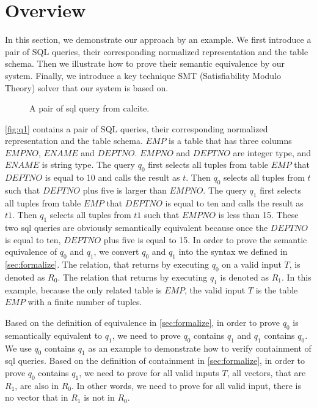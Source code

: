 \section{Overview}\label{sec:overview}
%
In this section, we demonstrate our approach by an example.
%
We first introduce a pair of SQL queries, their corresponding normalized representation and the table schema.
%
Then we illustrate how to prove their semantic equivalence by our system.
%
Finally, we introduce a key technique SMT (Satisfiability Modulo Theory) solver that our system is based on.

%
\begin{figure}

\caption{%
    A pair of sql query from calcite.
  }\label{fig:q1}
\end{figure}
%

\autoref{fig:q1} contains a pair of SQL queries, their corresponding normalized representation and the table schema.
%
$EMP$ is a table that has three columns $EMPNO$, $ENAME$ and $DEPTNO$.
%
$EMPNO$ and $DEPTNO$ are integer type, and $ENAME$ is string type.
%
The query $q_0$ first selects all tuples from table $EMP$ that $DEPTNO$ is equal to
10 and calls the result as $t$.
%
Then $q_0$ selects all tuples from $t$ such that $DEPTNO$ plus five is larger than $EMPNO$.
%
The query $q_1$ first selects all tuples from table $EMP$ that $DEPTNO$ is equal to
ten and calls the result as $t1$.
%
Then $q_1$ selects all tuples from $t1$ such that $EMPNO$ is less than 15.
%
These two sql queries are obviously semantically equivalent 
because once the $DEPTNO$ is equal to ten, $DEPTNO$ plus five is equal to 15.
%
In order to prove the semantic equivalence of $q_0$ and $q_1$, we convert $q_0$ and 
$q_1$ into the syntax we defined in \autoref{sec:formalize}.
%
The relation, that returns by executing $q_0$ on a valid input $T$, is denoted as $R_0$.
%
The relation that returns by executing $q_1$ is denoted as $R_1$.
%
In this example, because the only related table is $EMP$, the valid input $T$ is the table $EMP$ with a
finite number of tuples.

%
Based on the definition of equivalence in \autoref{sec:formalize}, in order to prove $q_0$ is semantically
equivalent to $q_1$, we need to prove $q_0$ contains $q_1$ and $q_1$ contains $q_0$.
%
We use $q_0$ contains $q_1$ as an example to demonstrate how to verify containment of sql queries.
%
Based on the definition of containment in \autoref{sec:formalize}, in order to prove $q_0$ contains 
$q_1$, we need to prove for all valid inputs $T$, all vectors, that are $R_1$, are also in $R_0$. 
%
In other words, we need to prove for all valid input, there is no vector that in $R_1$ is not in $R_0$.
%


